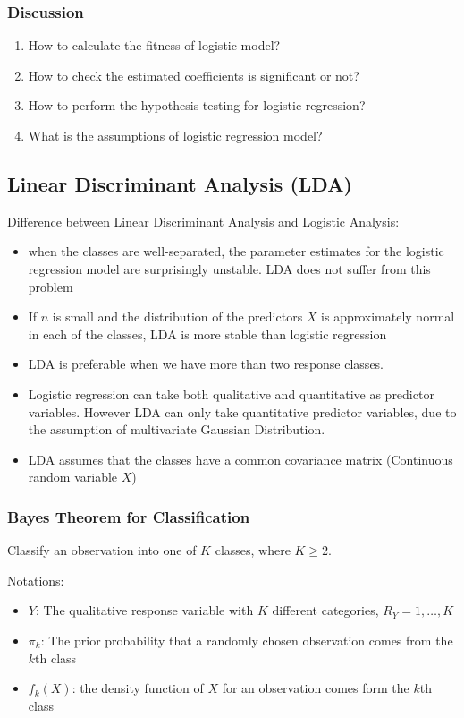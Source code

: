     \documentclass[12pt,fleqn,a4paper]{article}%
\theoremstyle{definition}
\theoremstyle{plain}
\numberwithin{equation}{section}
\begin{document}
\subsubsection{Discussion}
\begin{enumerate}
\item How to calculate the fitness of logistic model?
\item How to check the estimated coefficients is significant or not?
\item How to perform the hypothesis testing for logistic regression? 
\item What is the assumptions of logistic regression model?
\end{enumerate}

\subsection{\textbf{Linear Discriminant Analysis (LDA)}}

Difference between Linear Discriminant Analysis and Logistic Analysis:
\begin{itemize}
\item when the classes are well-separated, the parameter estimates for the logistic regression model are surprisingly unstable. LDA does not suffer from this problem
\item If $n$ is small and the distribution of the predictors $X$ is approximately normal in each of the classes, LDA is more stable than logistic regression
\item LDA is preferable when we have more than two response classes.
\item Logistic regression can take both qualitative and quantitative as predictor variables. However LDA can only take quantitative predictor variables, due to the assumption of multivariate Gaussian Distribution.
\item LDA assumes that the classes have a common covariance matrix
(Continuous random variable $X$)
\end{itemize}

\subsubsection{\textbf{Bayes Theorem for Classification}}
Classify an observation into one of $K$ classes, where $K \geq 2$.

Notations: 
\begin{itemize}
\item $Y$: The qualitative response variable with $K$ different categories, $R_{Y} = {1,\dots,K}$
\item $\pi_{k}$: The prior probability that a randomly chosen observation comes from the $k$th class
\item $f_{k}(X)$: the density function of $X$ for an observation comes form the $k$th class
\end{itemize}
\end{document}
